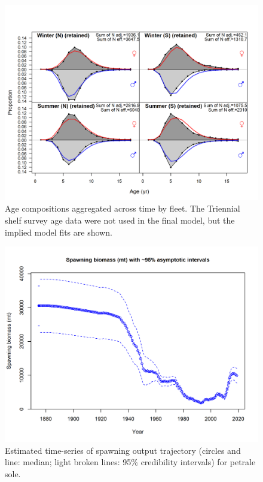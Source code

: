 \documentclass[12pt,]{article}
\begin{document}
\begin{figure}
\centering
\includegraphics{r4ss/plots_mod1/comp_agefit__aggregated_across_time.png}
\caption{Age compositions aggregated across time by fleet. The Triennial
shelf survey age data were not used in the final model, but the implied
model fits are shown. \label{fig:age_agg}}
\end{figure}

\FloatBarrier

\begin{figure}
\centering
\includegraphics{r4ss/plots_mod1/ts7_Spawning_biomass_(mt)_with_95_asymptotic_intervals_intervals}
\caption{Estimated time-series of spawning output trajectory (circles
and line: median; light broken lines: 95\% credibility intervals) for
petrale sole. \label{fig:ssb}}
\end{figure}
\end{document}
